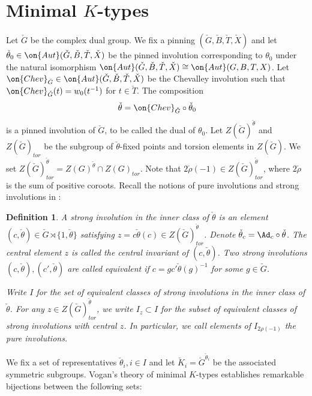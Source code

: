 \documentclass[12pt]{amsart}
\newtheorem{defe}[thm]{Definition}
\theoremstyle{remark}
\begin{document}











\section{Minimal $K$-types}
Let $\check G$ be the complex dual group. 
We fix a pinning $(\check G,\check B,\check T,\check X)$ and let $\check\theta_0\in\on{Aut}(\check G,\check B,\check T,\check X)$ be the pinned involution 
corresponding to $\theta_0$ under the 
natural isomorphism $\on{Aut}(\check G,\check B,\check T,\check X)\cong \on{Aut}(G,B,T,X)$.
Let $\on{Chev}_{\check G}\in \on{Aut}(\check G,\check B,\check T,\check X)$ be the Chevalley involution such that $\on{Chev}_{\check G}(t)=w_0(t^{-1})$ for $t\in\check T$.
The composition 
\[
\check\theta=\on{Chev}_{\check G}\circ\check\theta_0
\]
is a pinned involution of $\check G$, to be called the
dual of $\theta_0$.
Let $Z(\check G)^{\check\theta}$ and $Z(\check G)_{tor}$
be the subgroup of $\check\theta$-fixed points and torsion elements in $Z(\check G)$.
We set $Z(\check G)^{\check\theta}_{tor}=Z(G)^{\check\theta}\cap Z(G)_{tor}$.
Note that $2\check\rho(-1)\in Z(\check G)^{\check\theta}_{tor}$, where $2\check\rho$ is the sum of 
positive coroots.
Recall the notions of pure involutions and strong involutions in \cite{ABV}:

\begin{defe}
    A strong involution in the inner class of $\check\theta$
    is an element $(c,\check\theta)\in \check G\rtimes\{1,\check\theta\}$ satisfying
    $z=c\check\theta(c)\in Z(\check G)^{\check\theta}_{tor}$.
    Denote $\check\theta_c=\Ad_c\circ\check\theta$. 
    The central element $z$ is called the central invariant of $(c,\check\theta)$. 
    Two strong involutions $(c,\check\theta),(c',\check\theta)$
    are called equivalent if 
    $c=gc'\check\theta(g)^{-1}$ for some $g\in\check G$.

    Write $I$ for the set of equivalent classes of strong involutions in the inner class of $\check\theta$.
    For any $z\in Z(\check G)^{\check\theta}_{tor}$, we write  $I_z\subset I$ for the subset of equivalent classes of strong involutions with central $z$.
    In particular, we call elements of $I_{2\rho(-1)}$
    the pure involutions.
\end{defe}

We fix a set of  representatives $\check\theta_i, i\in I$ and let $\check K_i=\check G^{\check\theta_i}$
be the associated symmetric subgroups. 
Vogan's theory of minimal $K$-types \cite{V} establishes remarkable bijections between the following sets:
\end{document}

